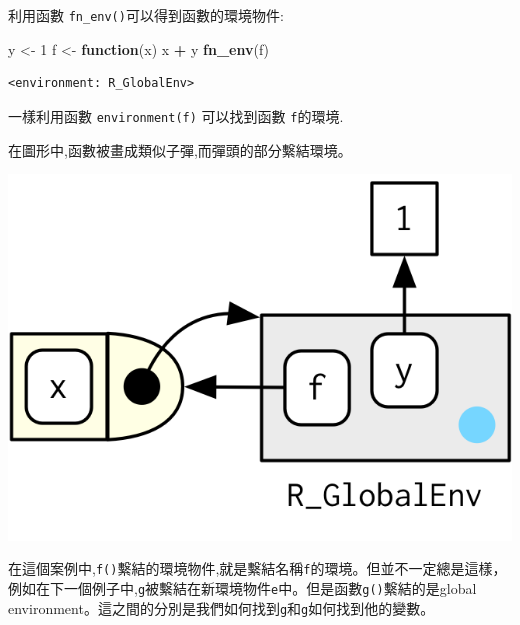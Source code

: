 \documentclass[]{book}
\newenvironment{Shaded}{\begin{snugshade}}{\end{snugshade}}
\newcommand{\ControlFlowTok}[1]{\textcolor[rgb]{0.13,0.29,0.53}{\textbf{#1}}}
\newcommand{\DecValTok}[1]{\textcolor[rgb]{0.00,0.00,0.81}{#1}}
\newcommand{\KeywordTok}[1]{\textcolor[rgb]{0.13,0.29,0.53}{\textbf{#1}}}
\newcommand{\NormalTok}[1]{#1}
\newcommand{\OperatorTok}[1]{\textcolor[rgb]{0.81,0.36,0.00}{\textbf{#1}}}
\newcommand{\StringTok}[1]{\textcolor[rgb]{0.31,0.60,0.02}{#1}}
\theoremstyle{definition}
\theoremstyle{definition}
\theoremstyle{definition}
\theoremstyle{remark}
\begin{document}
利用函數 \texttt{fn\_env()}可以得到函數的環境物件:

\begin{Shaded}
\begin{Highlighting}[]
\NormalTok{y <-}\StringTok{ }\DecValTok{1}
\NormalTok{f <-}\StringTok{ }\ControlFlowTok{function}\NormalTok{(x) x }\OperatorTok{+}\StringTok{ }\NormalTok{y}
\KeywordTok{fn_env}\NormalTok{(f)}
\end{Highlighting}
\end{Shaded}

\begin{verbatim}
<environment: R_GlobalEnv>
\end{verbatim}

一樣利用函數 \texttt{environment(f)} 可以找到函數 \texttt{f}的環境.

在圖形中,函數被畫成類似子彈,而彈頭的部分繫結環境。

\begin{center}\includegraphics{diagrams/environments/binding} \end{center}

在這個案例中,\texttt{f()}繫結的環境物件,就是繫結名稱\texttt{f}的環境。但並不一定總是這樣，例如在下一個例子中,\texttt{g}被繫結在新環境物件\texttt{e}中。但是函數\texttt{g()}繫結的是global
environment。這之間的分別是我們如何找到\texttt{g}和\texttt{g}如何找到他的變數。

\begin{Shaded}
\end{Shaded}
\end{document}
